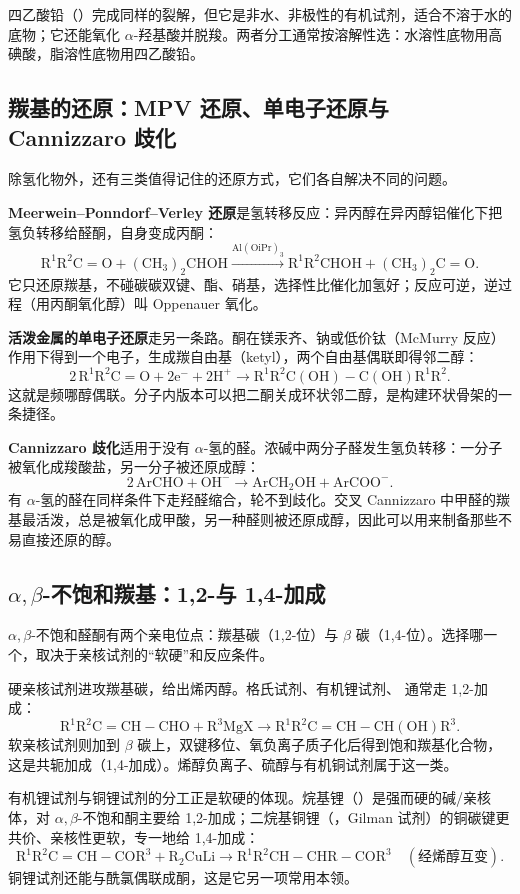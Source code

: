 \documentclass[UTF8]{ctexbook}
\begin{document}
四乙酸铅（）完成同样的裂解，但它是非水、非极性的有机试剂，适合不溶于水的底物；它还能氧化 $\alpha$-羟基酸并脱羧。两者分工通常按溶解性选：水溶性底物用高碘酸，脂溶性底物用四乙酸铅。

\subsection{羰基的还原：MPV 还原、单电子还原与 Cannizzaro 歧化}

除氢化物外，还有三类值得记住的还原方式，它们各自解决不同的问题。

\textbf{Meerwein--Ponndorf--Verley 还原}是氢转移反应：异丙醇在异丙醇铝催化下把氢负转移给醛酮，自身变成丙酮：
\[
\mathrm{R^1R^2C=O}+\mathrm{(CH_3)_2CHOH}
\xrightarrow{\mathrm{Al(OiPr)_3}}
\mathrm{R^1R^2CHOH}+\mathrm{(CH_3)_2C=O}.
\]
它只还原羰基，不碰碳碳双键、酯、硝基，选择性比催化加氢好；反应可逆，逆过程（用丙酮氧化醇）叫 Oppenauer 氧化。

\textbf{活泼金属的单电子还原}走另一条路。酮在镁汞齐、钠或低价钛（McMurry 反应）作用下得到一个电子，生成羰自由基（ketyl），两个自由基偶联即得邻二醇：
\[
2\,\mathrm{R^1R^2C=O}+2\mathrm{e^-}+2\mathrm{H^+}\longrightarrow
\mathrm{R^1R^2C(OH){-}C(OH)R^1R^2}.
\]
这就是频哪醇偶联。分子内版本可以把二酮关成环状邻二醇，是构建环状骨架的一条捷径。

\textbf{Cannizzaro 歧化}适用于没有 $\alpha$-氢的醛。浓碱中两分子醛发生氢负转移：一分子被氧化成羧酸盐，另一分子被还原成醇：
\[
2\,\mathrm{ArCHO}+\mathrm{OH^-}\longrightarrow
\mathrm{ArCH_2OH}+\mathrm{ArCOO^-}.
\]
有 $\alpha$-氢的醛在同样条件下走羟醛缩合，轮不到歧化。交叉 Cannizzaro 中甲醛的羰基最活泼，总是被氧化成甲酸，另一种醛则被还原成醇，因此可以用来制备那些不易直接还原的醇。

\subsection{$\alpha,\beta$-不饱和羰基：1,2-与 1,4-加成}

$\alpha,\beta$-不饱和醛酮有两个亲电位点：羰基碳（1,2-位）与 $\beta$ 碳（1,4-位）。选择哪一个，取决于亲核试剂的“软硬”和反应条件。

硬亲核试剂进攻羰基碳，给出烯丙醇。格氏试剂、有机锂试剂、 通常走 1,2-加成：
\[
\mathrm{R^1R^2C=CH{-}CHO}+\mathrm{R^3MgX}
\longrightarrow \mathrm{R^1R^2C=CH{-}CH(OH)R^3}.
\]
软亲核试剂则加到 $\beta$ 碳上，双键移位、氧负离子质子化后得到饱和羰基化合物，这是共轭加成（1,4-加成）。烯醇负离子、硫醇与有机铜试剂属于这一类。

有机锂试剂与铜锂试剂的分工正是软硬的体现。烷基锂（）是强而硬的碱/亲核体，对 $\alpha,\beta$-不饱和酮主要给 1,2-加成；二烷基铜锂（，Gilman 试剂）的铜碳键更共价、亲核性更软，专一地给 1,4-加成：
\[
\mathrm{R^1R^2C=CH{-}COR^3}+\mathrm{R_2CuLi}
\longrightarrow \mathrm{R^1R^2CH{-}CHR{-}COR^3}\quad(\text{经烯醇互变}).
\]
铜锂试剂还能与酰氯偶联成酮，这是它另一项常用本领。
\end{document}

